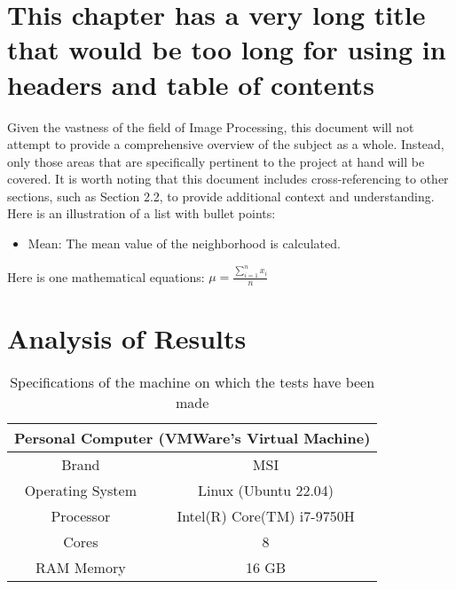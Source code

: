 \section{This chapter has a very long title that would be too long for using in headers and table of contents}

Given the vastness of the field of Image Processing, this document will not attempt to provide a comprehensive overview of the subject as a whole. Instead, only those areas that are specifically pertinent to the project at hand will be covered. It is worth noting that this document includes cross-referencing to other sections, such as Section 2.2, to provide additional context and understanding.
\medskip %
\newline %
Here is an illustration of a list with bullet points:
\begin{itemize}
    \item Mean: The mean value of the neighborhood is calculated.
\end{itemize}

\noindent Here is one mathematical equations:
\medskip %
\newline %
$\mu = \frac{\sum_{i=1}^{n} x_i}{n}$
\medskip %
\newline

\section{Analysis of Results}

\noindent
\blindtext
\medskip
\newline

\begin{table}[!ht]
    \centering
    \begin{tabular}{|c|c|}
    \hline
        \multicolumn{2}{|c|}{Personal Computer (VMWare's Virtual Machine)} \\ \hline
        Brand & MSI \\ \hline
        Operating System & Linux (Ubuntu 22.04) \\ \hline
        Processor & Intel(R) Core(TM) i7-9750H \\ \hline
        Cores & 8 \\ \hline
        RAM Memory & 16 GB \\ \hline
    \end{tabular}
    \caption{Specifications of the machine on which the tests have been made}
\end{table}
\noindent \blindtext
\newline

